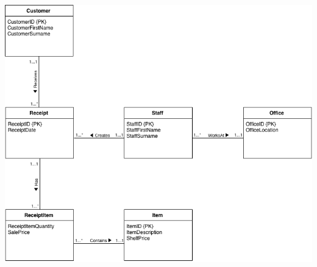 \documentclass{article}
\begin{document}
            \bigskip

            \begin{center}
                \includegraphics[width=\textwidth-40pt,keepaspectratio]{Images/A2-EERModel.png}
            \end{center}


    \newpage
\end{document}
